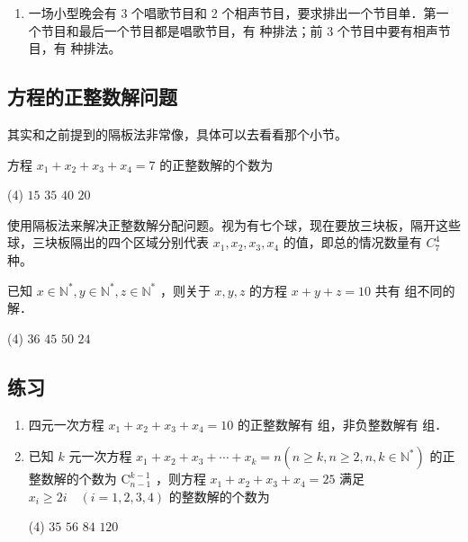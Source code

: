 \begin{enumerate}
    \item 一场小型晚会有 3 个唱歌节目和 2 个相声节目，要求排出一个节目单．第一个节目和最后一个节目都是唱歌节目，有 \underline{\hspace{2cm}}种排法；前 3 个节目中要有相声节目，有 \underline{\hspace{2cm}}种排法。
\end{enumerate}

\subsection{方程的正整数解问题}

其实和之前提到的隔板法非常像，具体可以去看看那个小节。

\begin{example}
    方程 $x_{1}+x_{2}+x_{3}+x_{4}=7$ 的正整数解的个数为
    \begin{tasks}(4)
        \task $15$
        \task $35$
        \task $40$
        \task $20$
    \end{tasks}
\end{example}

\begin{solution}
    使用隔板法来解决正整数解分配问题。视为有七个球，现在要放三块板，隔开这些球，三块板隔出的四个区域分别代表 $x_1, x_2, x_3, x_4$ 的值，即总的情况数量有 $C_7^4$ 种。
\end{solution}

\vspace{2em}

\begin{example}
    已知 $x \in \mathbb{N}^{*}, y \in \mathbb{N}^{*}, z \in \mathbb{N}^{*}$ ，则关于 $x, y, z$ 的方程 $x+y+z=10$ 共有 \underline{\hspace{1.5cm}} 组不同的解．
    \begin{tasks}(4)
        \task $36$
        \task $45$
        \task $50$
        \task $24$
    \end{tasks}
\end{example}

\subsection*{练习}

\begin{enumerate}
    \item 四元一次方程 $x_{1}+x_{2}+x_{3}+x_{4}=10$ 的正整数解有 \underline{\hspace{2cm}}组，非负整数解有 \underline{\hspace{2cm}}组．

    \item 已知 $k$ 元一次方程 $x_{1}+x_{2}+x_{3}+\cdots+x_{k}=n\left(n \geq k, n \geq 2, n, k \in \mathbb{N}^{*}\right)$ 的正整数解的个数为 $\mathrm{C}_{n-1}^{k-1}$ ，则方程 $x_{1}+x_{2}+x_{3}+x_{4}=25$ 满足 $x_{i} \geq 2 i \quad(i=1,2,3,4)$ 的整数解的个数为
          \begin{tasks}(4)
              \task $35$
              \task $56$
              \task $84$
              \task $120$
          \end{tasks}
\end{enumerate}


